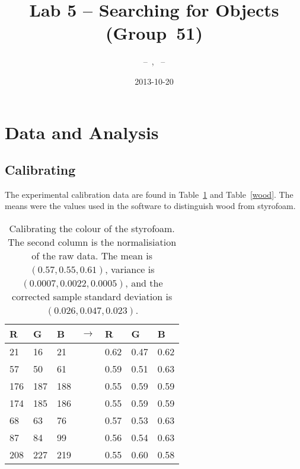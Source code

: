 \documentclass[twocolumn]{article}
\author{\bname~--~\bid, \name~--~\id}
\title{Lab 5 -- Searching for Objects (Group~51)}
\date{2013-10-20}
\begin{document}
\maketitle



\section{Data and Analysis}

\subsection{Calibrating}

The experimental calibration data are found in Table~\ref{styrofoam} and Table~\ref{wood}. The means were the values used in the software to distinguish wood from styrofoam.

\begin{table}[htb]
\centering
\begin{tabular}{@{(}l@{, }l@{, }l@{)} l @{(}l@{, }l@{, }l@{)}}
R & G & B & $\rightarrow$ & R & G & B \\
\hline
21 & 16 & 21 &  & 0.62 & 0.47 & 0.62 \\
57 & 50 & 61 &  & 0.59 & 0.51 & 0.63 \\
176 & 187 & 188 &  & 0.55 & 0.59 & 0.59 \\
174 & 185 & 186 &  & 0.55 & 0.59 & 0.59 \\
68 & 63 & 76 &  & 0.57 & 0.53 & 0.63 \\
87 & 84 & 99 &  & 0.56 & 0.54 & 0.63 \\
208 & 227 & 219 &  & 0.55 & 0.60 & 0.58 \\
\end{tabular}
\caption{Calibrating the colour of the styrofoam. The second column is the normalisiation of the raw data.
The mean is $(0.57, 0.55, 0.61)$, variance is $(0.0007, 0.0022, 0.0005)$, and the corrected sample standard deviation is $(0.026, 0.047, 0.023)$.}
\label{styrofoam}
\end{table}
\end{document}
